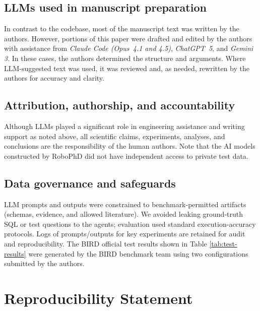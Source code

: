 \documentclass{article}
\begin{document}
\subsection{LLMs used in manuscript preparation}
\label{app:llm-usage:writing}

In contrast to the codebase, most of the manuscript text was written by the authors.  However, portions of this paper were drafted and edited by the authors with assistance from \emph{Claude Code (Opus~4.1 and 4.5)}, \emph{ChatGPT~5}, and \emph{Gemini 3}. In these cases, the authors determined the structure and arguments. Where LLM-suggested text was used, it was reviewed and, as needed, rewritten by the authors for accuracy and clarity.

\subsection{Attribution, authorship, and accountability}
\label{app:llm-usage:authorship}

Although LLMs played a significant role in engineering assistance and writing support as noted above, all scientific claims, experiments, analyses, and conclusions are the responsibility of the human authors. Note that the AI models constructed by RoboPhD did not have independent access to private test data. 

\subsection{Data governance and safeguards}
\label{app:llm-usage:safeguards}

LLM prompts and outputs were constrained to benchmark-permitted artifacts (schemas, evidence, and allowed literature). We avoided leaking ground-truth SQL or test questions to the agents; evaluation used standard execution-accuracy protocols. Logs of prompts/outputs for key experiments are retained for audit and reproducibility.  The BIRD official test results shown in Table \ref{tab:test-results} were generated by the BIRD benchmark team using two configurations submitted by the authors. 

\section{Reproducibility Statement}
\label{app:repro}
\end{document}
